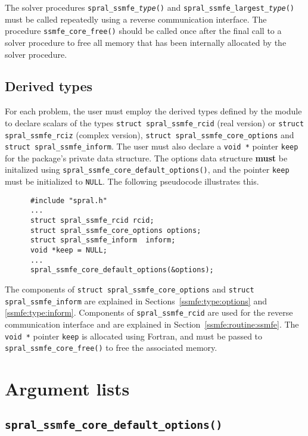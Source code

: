 \noindent
The solver procedures \texttt{spral\_ssmfe\_\textit{type}()} and \texttt{spral\_ssmfe\_largest\_\textit{type}()}
must be called repeatedly using
a reverse communication interface.
The procedure \texttt{ssmfe\_core\_free()}
should be called once after the
final call to 
a solver procedure
to free all memory that has been internally
allocated by
the solver procedure.

\subsection{Derived types}
\label{sec:derived}

For each problem, the user must employ the derived types defined by the
module to declare scalars of the types 
{\tt struct spral\_ssmfe\_rcid} (real version) or 
{\tt struct spral\_ssmfe\_rciz} (complex version), 
{\tt struct spral\_ssmfe\_core\_options} and 
{\tt struct spral\_ssmfe\_inform}. The user must also declare a \texttt{void *}
pointer \texttt{keep} for the package's private data structure. The options
data structure \textbf{must} be initalized using \texttt{spral\_ssmfe\_core\_default\_options()},
and the pointer \texttt{keep} must be initialized to \texttt{NULL}.
The following pseudocode illustrates this.
\begin{verbatim}
      #include "spral.h"
      ...
      struct spral_ssmfe_rcid rcid;
      struct spral_ssmfe_core_options options;
      struct spral_ssmfe_inform  inform;
      void *keep = NULL;
      ...
      spral_ssmfe_core_default_options(&options);
\end{verbatim}
The components of {\tt struct spral\_ssmfe\_core\_options} and {\tt struct spral\_ssmfe\_inform} are explained
in Sections~\ref{ssmfe:type:options} and \ref{ssmfe:type:inform}. Components
of \texttt{spral\_ssmfe\_rcid} are used for the reverse communication interface and
are explained in Section~\ref{ssmfe:routine:ssmfe}.
The \texttt{void~*} pointer \texttt{keep} is allocated using Fortran, and
must be passed to \texttt{spral\_ssmfe\_core\_free()} to free the associated
memory.

\section{Argument lists}

\subsection{\texttt{spral\_ssmfe\_core\_default\_options()}}


